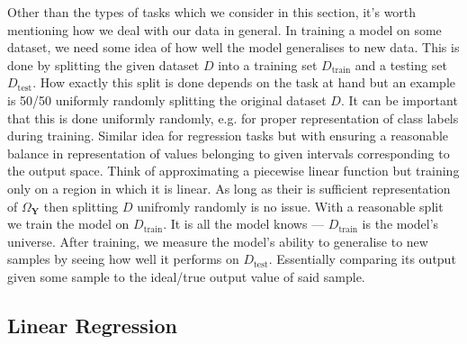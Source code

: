 \documentclass[11pt]{article}
\begin{document}
Other than the types of tasks which we consider in this section, it's worth mentioning how we deal with our data in general. In training a model on some dataset, we need some idea of how well the model generalises to new data. This is done by splitting the given dataset $D$ into a training set $D_{\text{train}}$ and a testing set $D_{\text{test}}$. How exactly this split is done depends on the task at hand but an example is 50/50 uniformly randomly splitting the original dataset $D$. It can be important that this is done uniformly randomly, e.g. for proper representation of class labels during training. Similar idea for regression tasks but with ensuring a reasonable balance in representation of values belonging to given intervals corresponding to the output space. Think of approximating a piecewise linear function but training only on a region in which it is linear. As long as their is sufficient representation of $\Omega_{\mathbf{Y}}$ then splitting $D$ unifromly randomly is no issue. With a reasonable split we train the model on $D_{\text{train}}$. It is all the model knows — $D_{\text{train}}$ is the model's universe. After training, we measure the model's ability to generalise to new samples by seeing how well it performs on $D_{\text{test}}$. Essentially comparing its output given some sample to the ideal/true output value of said sample.

\subsection{Linear Regression}
\end{document}
